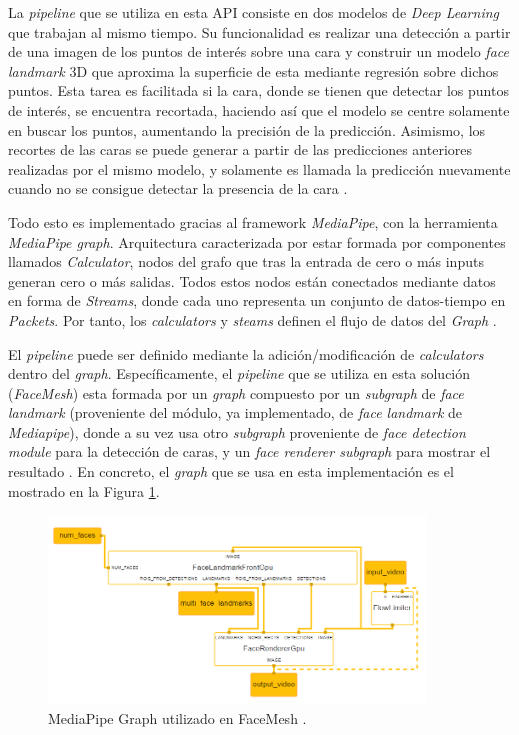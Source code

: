 La \textit{pipeline} que se utiliza en esta API consiste en dos modelos de \textit{Deep Learning} que trabajan al mismo tiempo. Su funcionalidad es realizar una detección a partir de una imagen de los puntos de interés sobre una cara y construir un modelo \textit{face landmark} 3D que aproxima la superficie de esta mediante regresión sobre dichos puntos. Esta tarea es facilitada si la cara, donde se tienen que detectar los puntos de interés, se encuentra recortada, haciendo así que el modelo se centre solamente en buscar los puntos, aumentando la precisión de la predicción. Asimismo, los recortes de las caras se puede generar a partir de las predicciones anteriores realizadas por el mismo modelo, y solamente es llamada la predicción nuevamente cuando no se consigue detectar la presencia de la cara \cite{faceMesh}.

Todo esto es implementado gracias al framework \textit{MediaPipe}, con la herramienta \textit{MediaPipe graph}. Arquitectura caracterizada por estar formada por componentes llamados \textit{Calculator}, nodos del grafo que tras la entrada de cero o más inputs generan cero o más salidas. Todos estos nodos están conectados mediante datos en forma de \textit{Streams}, donde cada uno representa un conjunto de datos-tiempo en \textit{Packets}. Por tanto, los \textit{calculators} y \textit{steams} definen el flujo de datos del \textit{Graph} \cite{mediapipe}.

El \textit{pipeline} puede ser definido mediante la adición/modificación de \textit{calculators} dentro del \textit{graph}. Específicamente, el \textit{pipeline} que se utiliza en esta solución (\textit{FaceMesh}) esta formada por un \textit{graph} compuesto por un \textit{subgraph} de \textit{face landmark} (proveniente del módulo, ya implementado, de \textit{face landmark} de \textit{Mediapipe}), donde a su vez usa otro \textit{subgraph} proveniente de \textit{face detection module} para la detección de caras, y un \textit{face renderer subgraph} para mostrar el resultado \cite{faceMesh}. En concreto, el \textit{graph} que se usa en esta implementación es el mostrado en la Figura \ref{fig:faceMesh}.

\begin{figure}[htp]
	\centering
	\includegraphics[width=10cm]{imagenes/faceMesh.png}
	\caption{MediaPipe Graph utilizado en FaceMesh \cite{mpGraph}.}
	\label{fig:faceMesh}
\end{figure}

